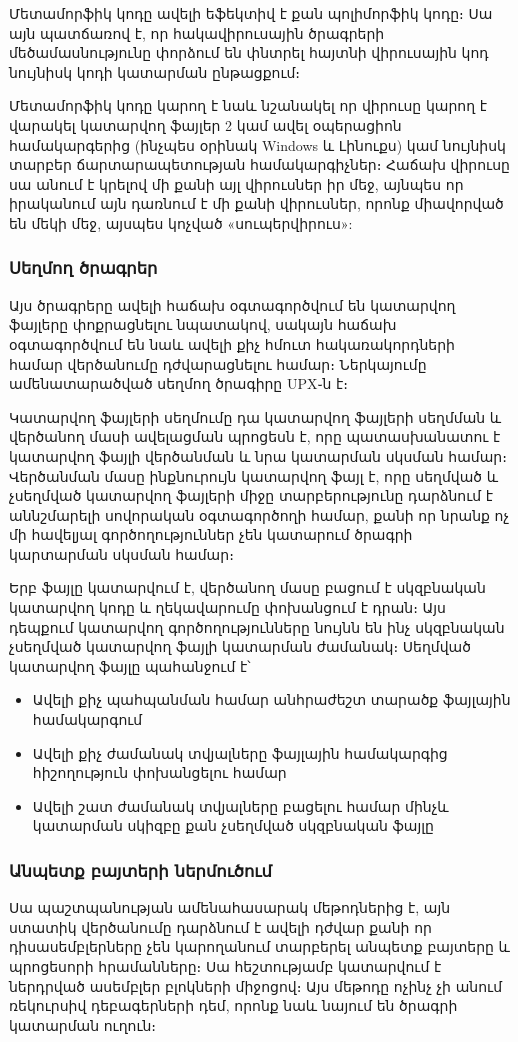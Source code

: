 \documentclass[12pt]{article}
\begin{document}
\begin{sloppypar}
	Մետամորֆիկ կոդը ավելի եֆեկտիվ է քան պոլիմորֆիկ կոդը։ Սա այն պատճառով է,
	որ հակավիրուսային ծրագրերի մեծամասնությունը փորձում են փնտրել հայտնի
	վիրուսային կոդ նույնիսկ կոդի կատարման ընթացքում։

	Մետամորֆիկ կոդը կարող է նաև նշանակել որ վիրուսը կարող է վարակել
	կատարվող ֆայլեր 2 կամ ավել օպերացիոն համակարգերից (ինչպես օրինակ Windows և
	Լինուքս) կամ նույնիսկ տարբեր ճարտարապետության համակարգիչներ։ Հաճախ
	վիրուսը սա անում է կրելով մի քանի այլ վիրուսներ իր մեջ, այնպես որ
	իրականում այն դառնում է մի քանի վիրուսներ, որոնք միավորված են մեկի մեջ,
	այսպես կոչված «սուպերվիրուս»:

\subsubsection{Սեղմող ծրագրեր}
	Այս ծրագրերը ավելի հաճախ օգտագործվում են կատարվող ֆայլերը փոքրացնելու
	նպատակով, սակայն հաճախ օգտագործվում են նաև ավելի քիչ հմուտ հակառակորդների
	համար վերծանումը դժվարացնելու համար։ Ներկայումը ամենատարածված սեղմող
	ծրագիրը UPX֊ն է։

	Կատարվող ֆայլերի սեղմումը դա կատարվող ֆայլերի սեղմման և վերծանող մասի
	ավելացման պրոցեսն է, որը պատասխանատու է կատարվող ֆայլի վերծանման և նրա
	կատարման սկսման համար։ Վերծանման մասը ինքնուրույն կատարվող ֆայլ է, որը
	սեղմված և չսեղմված կատարվող ֆայլերի միջը տարբերությունը դարձնում է
	աննշմարելի սովորական օգտագործողի համար, քանի որ նրանք ոչ մի հավելյալ
	գործողություններ չեն կատարում ծրագրի կարտարման սկսման համար։

	Երբ ֆայլը կատարվում է, վերծանող մասը բացում է սկզբնական կատարվող կոդը և
	ղեկավարումը փոխանցում է դրան։ Այս դեպքում կատարվող գործողությունները
	նույնն են ինչ սկզբնական չսեղմված կատարվող ֆայլի կատարման ժամանակ։
	Սեղմված կատարվող ֆայլը պահանջում է՝
	\begin{itemize}
	\item Ավելի քիչ պահպանման համար անհրաժեշտ տարածք ֆայլային համակարգում
	\item Ավելի քիչ ժամանակ տվյալները ֆայլային համակարգից հիշողություն
		փոխանցելու համար
	\item Ավելի շատ ժամանակ տվյալները բացելու համար մինչև կատարման սկիզբը քան
		չսեղմված սկզբնական ֆայլը
	\end{itemize}

\subsubsection{Անպետք բայտերի ներմուծում}
	Սա պաշտպանության ամենահասարակ մեթոդներից է, այն ստատիկ վերծանումը
	դարձնում է ավելի դժվար քանի որ դիսասեմբլերները չեն կարողանում
	տարբերել անպետք բայտերը և պրոցեսորի հրամանները։ Սա հեշտությամբ
	կատարվում է ներդրված ասեմբլեր բլոկների միջոցով։ Այս մեթոդը ոչինչ
	չի անում ռեկուրսիվ դեբագերների դեմ, որոնք նաև նայում են ծրագրի
	կատարման ուղուն։


\end{sloppypar}
\end{document}
